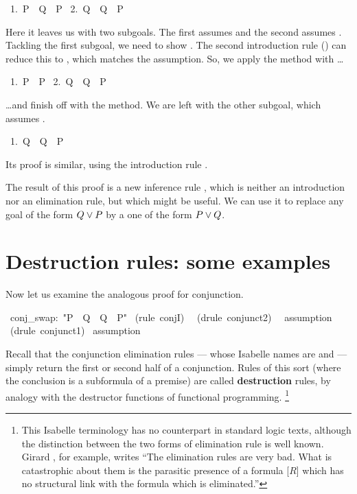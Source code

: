 \begin{isabelle}
\ 1.\ P\ \isasymLongrightarrow\ Q\ \isasymor\ P\isanewline
\ 2.\ Q\ \isasymLongrightarrow\ Q\ \isasymor\ P
\end{isabelle}
Here it leaves us with two subgoals.  The first assumes  and the 
second assumes .  Tackling the first subgoal, we need to 
show \@.  The second introduction rule ()
can reduce this  to , which matches the assumption. So, we apply the
{}  method with  \ldots
\begin{isabelle}
\ 1.\ P\ \isasymLongrightarrow\ P\isanewline
\ 2.\ Q\ \isasymLongrightarrow\ Q\ \isasymor\ P
\end{isabelle}
\ldots and finish off with the {} 
method.  We are left with the other subgoal, which 
assumes .  
\begin{isabelle}
\ 1.\ Q\ \isasymLongrightarrow\ Q\ \isasymor\ P
\end{isabelle}
Its proof is similar, using the introduction 
rule . 

The result of this proof is a new inference rule , which is neither 
an introduction nor an elimination rule, but which might 
be useful.  We can use it to replace any goal of the form $Q\vee P$
by a one of the form $P\vee Q$.



\section{Destruction rules: some examples}

Now let us examine the analogous proof for conjunction. 
\begin{isabelle}
\ conj_swap:\ "P\ \isasymand\ Q\ \isasymLongrightarrow\ Q\ \isasymand\ P"\isanewline
{}\ (rule\ conjI)\isanewline
\ \ (drule\ conjunct2)\isanewline
\ \ assumption\isanewline
{}\ (drule\ conjunct1)\isanewline
{}\ assumption
\end{isabelle}
Recall that the conjunction elimination rules --- whose Isabelle names are 
 and  --- simply return the first or second half
of a conjunction.  Rules of this sort (where the conclusion is a subformula of a
premise) are called \textbf{destruction} rules, by analogy with the destructor
functions of functional programming.%
\footnote{This Isabelle terminology has no counterpart in standard logic texts, 
although the distinction between the two forms of elimination rule is well known. 
Girard \cite[page 74]{girard89}, for example, writes ``The elimination rules are very
bad.  What is catastrophic about them is the parasitic presence of a formula [$R$]
which has no structural link with the formula which is eliminated.''}

